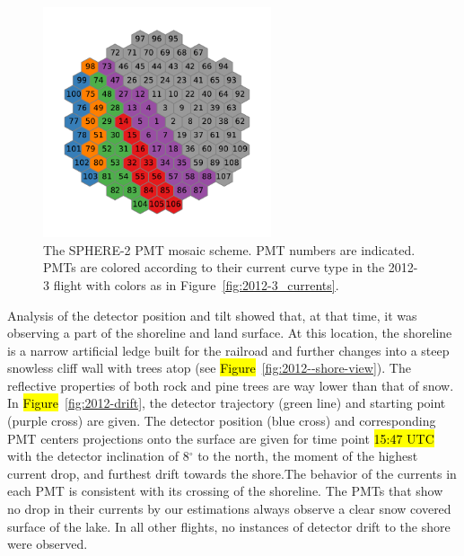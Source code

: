 \documentclass[universe,article,accept,moreauthors,pdftex]{Definitions/mdpi}
\begin{document}
\begin{figure}[H]
        \includegraphics[width=0.6\textwidth]{2012-3_retina_all.pdf}
        \caption{The SPHERE-2 PMT mosaic scheme. PMT numbers are indicated. PMTs are colored according to their current curve type in the 2012-3 flight with colors as in Figure~\ref{fig:2012-3_currents}.}
        \label{fig:2012-3_shore_image}
\end{figure}


Analysis of the detector position and tilt showed that, at that time, it was observing a part of the shoreline and land surface. At this location, the shoreline is a narrow artificial ledge built for the railroad and further changes into a steep snowless cliff wall with trees atop (see \hl{Figure}~\ref{fig:2012--shore-view}). The reflective properties of both rock and pine trees are way lower than that of snow. In \hl{Figure}~\ref{fig:2012-drift}, the detector trajectory (green line) and starting point (purple cross) are given. The detector position (blue cross) and corresponding PMT centers projections onto the surface are given for time point \hl{15:47 UTC} 
with the detector inclination of 8$^\circ$ to the north, the moment of the highest current drop, and furthest drift towards the shore.The behavior of the currents in each PMT is consistent with its crossing of the shoreline. The PMTs that show no drop in their currents by our estimations always observe a clear snow covered surface of the lake. In all other flights, no instances of detector drift to the shore were observed.%
\end{document}
